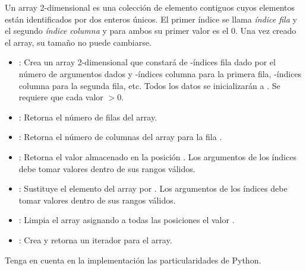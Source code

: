 

\begin{definition}{}\label{def:TDAArray2D}

Un array 2-dimensional es una colección de elemento contiguos cuyos elementos están identificados por dos enteros únicos. El primer índice se llama \textit{índice fila} y el segundo \textit{índice columna}  y para ambos su primer valor es el $0$. Una vez creado el array, su tamaño no puede cambiarse.
\begin{itemize}
\item {}: Crea un array 2-dimensional que constará de -índices fila dado por el número de argumentos dados y -índices columna para la primera fila,  -índices columna para la segunda fila, etc. Todos los datos se inicializarán a . Se requiere que cada valor $>0$.

\item {}: Retorna el número de filas del array.

\item {}: Retorna el número de columnas del array para la fila .

\item {}: Retorna el valor almacenado en la posición \cm[black]{[i, j]}. Los argumentos de los índices debe tomar valores dentro de sus rangos válidos.

\item {}: Sustituye el elemento \cm[black]{[i, j]} del array por . Los argumentos de los índices debe tomar valores dentro de sus rangos válidos.

\item {}: Limpia el array asignando a todas las posiciones el valor .

\item {}: Crea y retorna un iterador para el array.
\end{itemize}
Tenga en cuenta en la implementación las particularidades de Python.
\end{definition}



